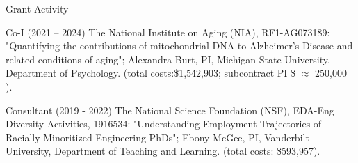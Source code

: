 \begin{rSection}{\textrm{Grant Activity}}%
\begin{etaremune}

\item Co-I (2021 – 2024) The National Institute on Aging (NIA), RF1-AG073189: "Quantifying the contributions of mitochondrial DNA to Alzheimer's Disease and related conditions of aging"; Alexandra Burt, PI, Michigan State University, Department of Psychology.  (total costs:\$1,542,903; subcontract PI \$ $\approx$ 250,000 ).

\item Consultant (2019 - 2022) The National Science Foundation (NSF), EDA-Eng Diversity Activities, 1916534: "Understanding Employment Trajectories of Racially Minoritized Engineering PhDs"; Ebony McGee, PI, Vanderbilt University, Department of Teaching and Learning. (total costs: \$593,957).
\end{etaremune}\end{rSection}